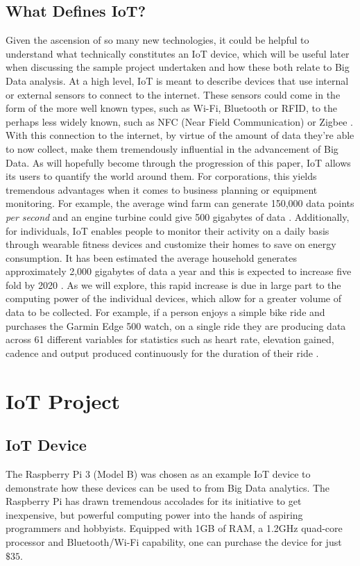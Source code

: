 \documentclass[sigconf]{acmart}
\begin{document}
\subsection{What Defines IoT?}
Given the ascension of so many new technologies, it could be helpful to understand what technically constitutes an IoT device, which will be useful later when discussing the sample project undertaken and how these both relate to Big Data analysis. 
At a high level, IoT is meant to describe devices that use internal or external sensors to connect to the internet. These sensors could come in the form of the more well known types, such as Wi-Fi, Bluetooth or RFID, to the perhaps less widely known, such as NFC (Near Field Communication) or Zigbee \cite{lopez}.
With this connection to the internet, by virtue of the amount of data they're able to now collect, make them tremendously influential in the advancement of Big Data. As will hopefully become through the progression of this paper, IoT allows its users to quantify the world around them. For corporations, this yields tremendous advantages when it comes to business planning or equipment monitoring. For example, the average wind farm can generate 150,000 data points \emph{per second} and an engine turbine could give 500 gigabytes of data \cite{wind}. Additionally, for individuals, IoT enables people to monitor their activity on a daily basis through wearable fitness devices and customize their homes to save on energy consumption. It has been estimated the average household generates approximately 2,000 gigabytes of data a year and this is expected to increase five fold by 2020 \cite{iotdata}. As we will explore, this rapid increase is due in large part to the computing power of the individual devices, which allow for a greater volume of data to be collected. For example, if a person enjoys a simple bike ride and purchases the Garmin Edge 500 watch, on a single ride they are producing data across 61 different variables for statistics such as heart rate, elevation gained, cadence and output produced continuously for the duration of their ride \cite{garmin}.

\section{IoT Project}
\subsection{IoT Device}
The Raspberry Pi 3 (Model B) was chosen as an example IoT device to demonstrate how these devices can be used to from Big Data analytics. The Raspberry Pi has drawn tremendous accolades for its initiative to get inexpensive, but powerful computing power into the hands of aspiring programmers and hobbyists. Equipped with 1GB of RAM, a 1.2GHz quad-core processor and Bluetooth/Wi-Fi capability, one can purchase the device for just $\$35$. 
\end{document}
